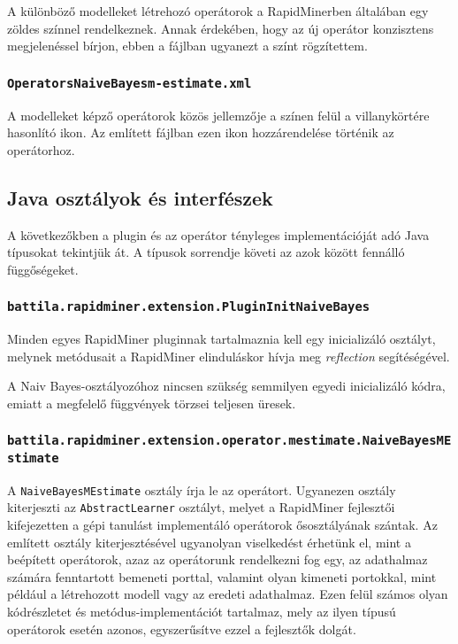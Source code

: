 \documentclass[a4paper]{article}
\begin{document}
A különböző modelleket létrehozó operátorok a RapidMinerben általában egy zöldes színnel rendelkeznek. Annak érdekében, hogy az új operátor konzisztens megjelenéssel bírjon, ebben a fájlban ugyanezt a színt rögzítettem.

\subsubsection{\texttt{OperatorsNaiveBayesm-estimate.xml}}

A modelleket képző operátorok közös jellemzője a színen felül a villanykörtére hasonlító ikon. Az említett fájlban ezen ikon hozzárendelése történik az operátorhoz.

\subsection{Java osztályok és interfészek}

A következőkben a plugin és az operátor tényleges implementációját adó Java típusokat tekintjük át. A típusok sorrendje követi az azok között fennálló függőségeket.

\subsubsection{\texttt{battila.rapidminer.extension.PluginInitNaiveBayes}}

Minden egyes RapidMiner pluginnak tartalmaznia kell egy inicializáló osztályt, melynek metódusait a RapidMiner elinduláskor hívja meg \textit{reflection} segítéségével.

A Naiv Bayes-osztályozóhoz nincsen szükség semmilyen egyedi inicializáló kódra, emiatt a megfelelő függvények törzsei teljesen üresek.

\subsubsection{\texttt{battila.rapidminer.extension.operator.mestimate.NaiveBayesMEstimate}}

A \texttt{NaiveBayesMEstimate} osztály írja le az operátort. Ugyanezen osztály kiterjeszti az \texttt{AbstractLearner} osztályt, melyet a RapidMiner fejlesztői kifejezetten a gépi tanulást implementáló operátorok ősosztályának szántak. Az említett osztály kiterjesztésével ugyanolyan viselkedést érhetünk el, mint a beépített operátorok, azaz az operátorunk rendelkezni fog egy, az adathalmaz számára fenntartott bemeneti porttal, valamint olyan kimeneti portokkal, mint például a létrehozott modell vagy az eredeti adathalmaz. Ezen felül számos olyan kódrészletet és metódus-implementációt tartalmaz, mely az ilyen típusú operátorok esetén azonos, egyszerűsítve ezzel a fejlesztők dolgát.
\end{document}
